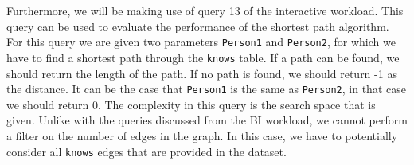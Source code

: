 Furthermore, we will be making use of query 13 of the interactive workload. This query can be used to evaluate the performance of the shortest path algorithm. For this query we are given two parameters \texttt{Person1} and \texttt{Person2}, for which we have to find a shortest path through the \texttt{knows} table. If a path can be found, we should return the length of the path. If no path is found, we should return -1 as the distance. It can be the case that \texttt{Person1} is the same as \texttt{Person2}, in that case we should return 0. The complexity in this query is the search space that is given. Unlike with the queries discussed from the BI workload, we cannot perform a filter on the number of edges in the graph. In this case, we have to potentially consider all \texttt{knows} edges that are provided in the dataset. 

